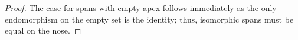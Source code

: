 \begin{proof}
The case for spans with empty apex follows immediately as the only endomorphism on the empty set is the identity; thus,  isomorphic spans must be equal on the nose.
\end{proof}
